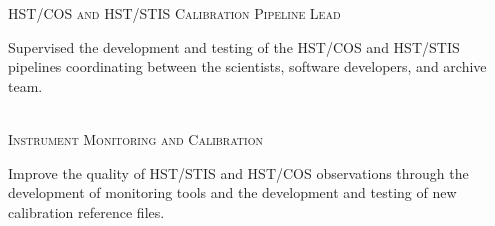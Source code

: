 \documentclass[10pt]{cv}
\begin{document}
\begin{llist}
\vspace{-0.1in}   
\textsc{HST/COS and HST/STIS Calibration Pipeline Lead}\\
\begin{minipage}[l]{0.7\textwidth}\vspace{0.15cm}
Supervised the development and testing of the HST/COS and HST/STIS pipelines coordinating between the scientists, software developers, and archive team. \\
\end{minipage}\vspace{0.15cm}
\\
\textsc{Instrument Monitoring and Calibration}\\
\begin{minipage}[l]{0.7\textwidth}\vspace{0.15cm}
Improve the quality of HST/STIS and HST/COS observations through the development of monitoring tools and the development and testing of new calibration reference files.\\
\end{minipage}\vspace{0.15cm}

\end{llist}
\end{document}
